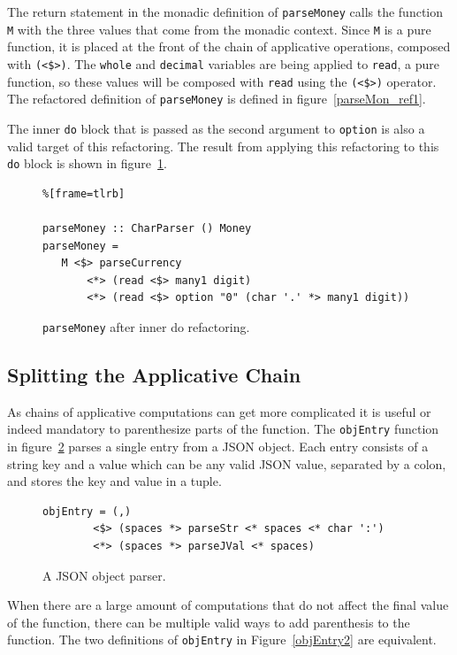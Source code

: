 The return statement in the monadic definition of \texttt{parseMoney} calls the function \texttt{M} with the three values that come from the monadic context. Since \texttt{M} is a pure function, it is placed at the front of the chain of applicative operations, composed with \texttt{(<\$>)}. The \texttt{whole} and \texttt{decimal} variables are being applied to \texttt{read}, a pure function, so these values will be composed with \texttt{read} using the \texttt{(<\$>)} operator. The refactored definition of \texttt{parseMoney} is defined in figure~\ref{parseMon_ref1}.

The inner \texttt{do} block that is passed as the second argument to \texttt{option} is also a valid target of this refactoring. The result from applying this refactoring to this \texttt{do} block is shown in figure~\ref{parseMon_ref2}.

\begin{figure}[t]
 \begin{lstlisting}%[frame=tlrb]

parseMoney :: CharParser () Money
parseMoney = 
   M <$> parseCurrency 
	   <*> (read <$> many1 digit) 
	   <*> (read <$> option "0" (char '.' *> many1 digit))
\end{lstlisting}
\caption{\texttt{parseMoney} after inner do refactoring.}
\label{parseMon_ref2}
\end{figure}

\subsection{Splitting the Applicative Chain}
As chains of applicative computations can get more complicated it is useful or indeed mandatory to parenthesize parts of the function. The \texttt{objEntry} function in figure~\ref{objEntry} parses a single entry from a JSON object. Each entry consists of a string key and a value which can be any valid JSON value, separated by a colon, and stores the key and value in a tuple. 

\begin{figure}[t]
\begin{lstlisting}
objEntry = (,) 
        <$> (spaces *> parseStr <* spaces <* char ':') 
        <*> (spaces *> parseJVal <* spaces)
\end{lstlisting}
\caption{A JSON object parser.}
\label{objEntry}
\end{figure}

When there are a large amount of computations that do not affect the final value of the function, there can be multiple valid ways to add parenthesis to the function. The two definitions of \texttt{objEntry} in Figure~\ref{objEntry2} are equivalent.

